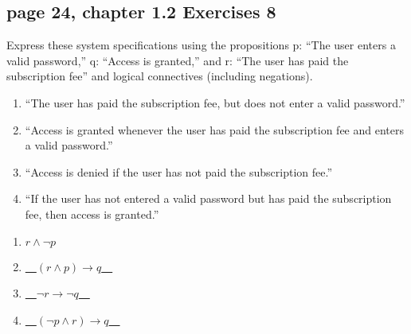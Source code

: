 \documentclass[sigconf]{acmart}
\begin{document}
\subsection{page 24, chapter 1.2 Exercises 8}
\begin{shaded}
    Express these system specifications using the propositions p: “The user enters a valid password,” q: “Access is granted,” and r: “The user has paid the subscription fee” and logical connectives (including negations).
    \begin{enumerate}[label=(\alph*)]
        \item “The user has paid the subscription fee, but does not
        enter a valid password.”
        \item “Access is granted whenever the user has paid the
        subscription fee and enters a valid password.”
        \item “Access is denied if the user has not paid the subscription fee.”
        \item “If the user has not entered a valid password but has
        paid the subscription fee, then access is granted.”
    \end{enumerate}
\end{shaded}  
\begin{enumerate}[label=(\alph*)]
	\item $r \land \neg p$
	\item \underline{~~$(r \land p) \rightarrow q$~~}
	\item \underline{~~$\neg r \rightarrow \neg q$~~}
	\item \underline{~~$(\neg p \land r) \rightarrow q$~~}
\end{enumerate}
\end{document}
